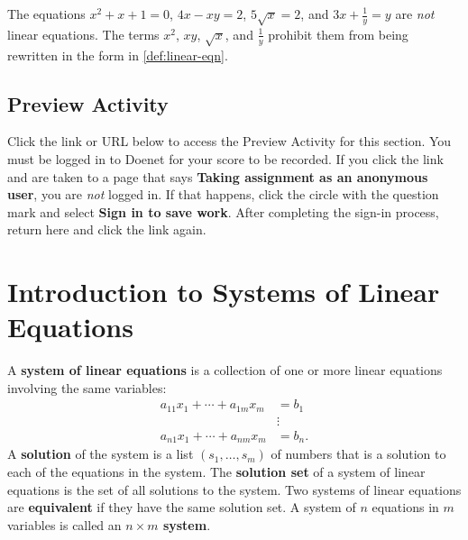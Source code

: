 \documentclass{article}
\begin{document}
\begin{example}\label{ex:linear-eqn-non}
The equations \(x^2+x+1=0\), \(4x-xy=2\), \(5\sqrt{x}=2\), and \(3x+\frac{1}{y}=y\) are \textit{not} linear equations. The terms \(x^2\), \(xy\), \(\sqrt{x}\), and \(\frac{1}{y}\) prohibit them from being rewritten in the form in \cref{def:linear-eqn}.
\end{example}

\subsection*{Preview Activity}\label{subsec:preview}

Click the link or URL below to access the Preview Activity for this section. You must be logged in to Doenet for your score to be recorded. If you click the link and are taken to a page that says \textbf{Taking assignment as an anonymous user}, you are \textit{not} logged in. If that happens, click the circle with the question mark and select \textbf{Sign in to save work}. After completing the sign-in process, return here and click the link again.



\section{Introduction to Systems of Linear Equations}\label{sec:systems}

\begin{definition}
A \textbf{system of linear equations} is a collection of one or more linear equations involving the same variables:
\begin{align*}
    a_{11}x_1+\cdots+a_{1m}x_m&=b_1 \\
    &\vdots \\
    a_{n1}x_1+\cdots+a_{nm}x_m&=b_n.
\end{align*}
A \textbf{solution} of the system is a list \((s_1, \ldots, s_m)\) of numbers that is a solution to each of the equations in the system. The \textbf{solution set} of a system of linear equations is the set of all solutions to the system. Two systems of linear equations are \textbf{equivalent} if they have the same solution set. A system of \(n\) equations in \(m\) variables is called an \textbf{\(n \times m\) system}.
\end{definition}
\end{document}
